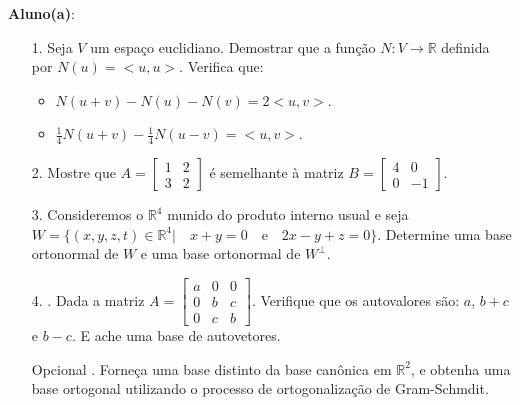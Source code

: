 \documentclass[oneside,a4paper,12pt]{article}
\begin{document}
     \begin{flushleft}
     	\textbf{Aluno(a)}:
     \end{flushleft}
 
 \begin{itemize}
 	\item[1.] Seja $V$ um espaço euclidiano. Demostrar que a função $N:V\rightarrow \mathbb{R}$ definida por $N(u)=<u,u>$. Verifica que:
 	\begin{itemize}
 		\item $N(u+v)-N(u)-N(v)=2<u,v>$.
 		\item $\frac{1}{4}N(u+v)-\frac{1}{4}N(u-v)=<u,v>$.
 	\end{itemize}
 \end{itemize}
 \begin{itemize}
 	\item[2.]  Mostre que $A=\begin{bmatrix}
 	1    & 2 \\
 	3    & 2
 	\end{bmatrix}$ é semelhante à matriz $B=\begin{bmatrix}
 	4    & 0 \\
 	0    & -1
 	\end{bmatrix}$.
 \end{itemize}
 \begin{itemize}
 	\item [3.] Consideremos o $\mathbb{R}^{4}$ munido do produto interno usual e seja $W=\{(x,y,z,t)\in \mathbb{R}^{4}|\quad x+y=0 \quad\text{e}\quad 2x-y+z=0\}$. Determine uma base ortonormal de $W$ e uma base ortonormal de $W^{\bot}$.
 \end{itemize}
 \begin{itemize}
 	\item[4.]. Dada a matriz $A=\begin{bmatrix}
 	a    & 0 & 0 \\
 	0    & b & c \\
 	0    & c & b
 	\end{bmatrix}$. Verifique que os autovalores são: $a$, $b+c$ e $b-c$. E ache uma base de autovetores.
 	
 \end{itemize}
\begin{itemize}
	\item[Opcional]. Forneça uma base distinto da base canônica em $\mathbb{R}^{2}$, e obtenha uma base ortogonal utilizando o processo de ortogonalização de Gram-Schmdit.
	
\end{itemize}	
\flushbottom
\flushright
\end{document}
